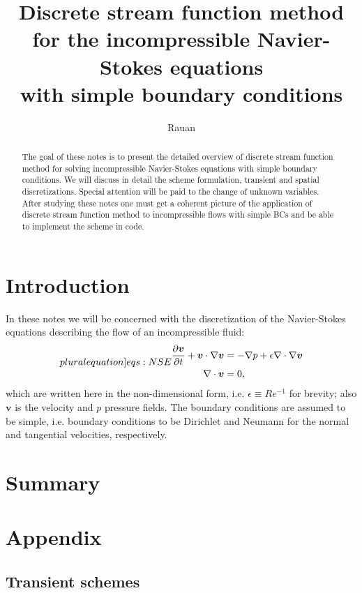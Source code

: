 \documentclass{article}
\title{Discrete stream function method \\ for the incompressible Navier-Stokes equations \\with simple boundary conditions}
\author{Rauan}
\numberwithin{equation}{section}
\begin{document}
\maketitle

\begin{abstract}
The goal of these notes is to present the detailed overview of discrete stream function method for solving incompressible Navier-Stokes equations with simple boundary conditions. We will discuss in detail the scheme formulation, transient and spatial discretizations. Special attention will be paid to the change of unknown variables. After studying these notes one must get a coherent picture of the application of discrete stream function method to incompressible flows with simple BCs and be able to implement the scheme in code.
\end{abstract}

\tableofcontents

\section{Introduction}\label{sec:introduction}

In these notes we will be concerned with the discretization of the Navier-Stokes equations describing the flow of an incompressible fluid:
\begin{subequations}
\label[pluralequation]{eqs:NSE}
\begin{align}
\label{eqn:momentum-intro}
\frac{\partial \boldsymbol{v}}{\partial t} + \boldsymbol{v} \cdot \nabla \boldsymbol{v} &= -\nabla p + \epsilon \nabla \cdot \nabla \boldsymbol{v} \\
\label{eqn:continuity}
\nabla \cdot \boldsymbol{v} &= 0,
\end{align}
\end{subequations}
which are written here in the non-dimensional form, i.e. $\epsilon \equiv Re^{-1}$ for brevity; also $\boldsymbol{v}$ is the velocity and $p$ pressure fields. The boundary conditions are assumed to be simple, i.e.  boundary conditions to be Dirichlet and Neumann for the normal and tangential velocities, respectively.
	
\section{Summary}\label{sec:summary}
	

\pagebreak




\pagebreak
\appendix
\section{Appendix}

\subsection{Transient schemes}
\end{document}
